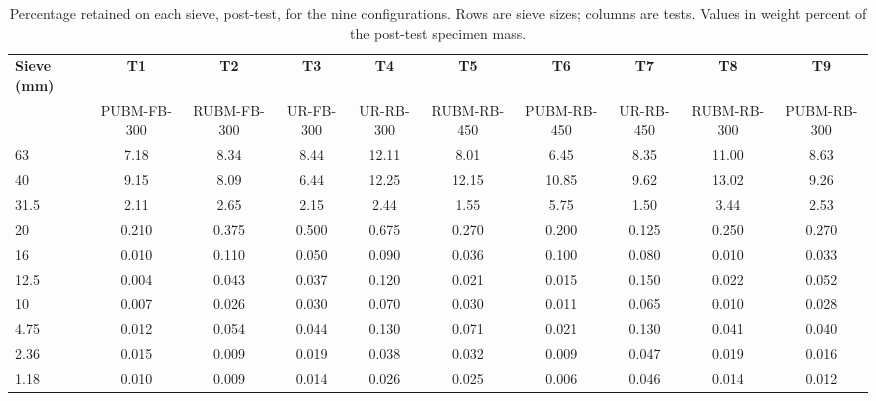 \begin{table}[H]
\centering
\caption{Percentage retained on each sieve, post-test, for the nine
         configurations. Rows are sieve sizes; columns are tests. Values
         in weight percent of the post-test specimen mass.}
\label{tab:appA-sieve}
\scriptsize
\setlength{\tabcolsep}{4pt}
\begin{adjustbox}{max width=\textwidth}
\begin{tabular}{@{}lccccccccc@{}}
    \toprule
    \rowcolor{tablehdr}
    {\color{white}\textbf{Sieve (mm)}}
    & {\color{white}\textbf{T1}} & {\color{white}\textbf{T2}}
    & {\color{white}\textbf{T3}} & {\color{white}\textbf{T4}}
    & {\color{white}\textbf{T5}} & {\color{white}\textbf{T6}}
    & {\color{white}\textbf{T7}} & {\color{white}\textbf{T8}}
    & {\color{white}\textbf{T9}}\\
    \rowcolor{tablehdr!80}
    & {\color{white}\scriptsize PUBM-FB-300} & {\color{white}\scriptsize RUBM-FB-300}
    & {\color{white}\scriptsize UR-FB-300}   & {\color{white}\scriptsize UR-RB-300}
    & {\color{white}\scriptsize RUBM-RB-450} & {\color{white}\scriptsize PUBM-RB-450}
    & {\color{white}\scriptsize UR-RB-450}   & {\color{white}\scriptsize RUBM-RB-300}
    & {\color{white}\scriptsize PUBM-RB-300}\\
    \midrule
    63    & 7.18  & 8.34  & 8.44  & 12.11 & 8.01  & 6.45  & 8.35  & 11.00 & 8.63\\
    40    & 9.15  & 8.09  & 6.44  & 12.25 & 12.15 & 10.85 & 9.62  & 13.02 & 9.26\\
    31.5  & 2.11  & 2.65  & 2.15  & 2.44  & 1.55  & 5.75  & 1.50  & 3.44  & 2.53\\
    20    & 0.210 & 0.375 & 0.500 & 0.675 & 0.270 & 0.200 & 0.125 & 0.250 & 0.270\\
    16    & 0.010 & 0.110 & 0.050 & 0.090 & 0.036 & 0.100 & 0.080 & 0.010 & 0.033\\
    12.5  & 0.004 & 0.043 & 0.037 & 0.120 & 0.021 & 0.015 & 0.150 & 0.022 & 0.052\\
    10    & 0.007 & 0.026 & 0.030 & 0.070 & 0.030 & 0.011 & 0.065 & 0.010 & 0.028\\
    4.75  & 0.012 & 0.054 & 0.044 & 0.130 & 0.071 & 0.021 & 0.130 & 0.041 & 0.040\\
    2.36  & 0.015 & 0.009 & 0.019 & 0.038 & 0.032 & 0.009 & 0.047 & 0.019 & 0.016\\
    1.18  & 0.010 & 0.009 & 0.014 & 0.026 & 0.025 & 0.006 & 0.046 & 0.014 & 0.012\\

\end{tabular}
\end{adjustbox}
\end{table}
